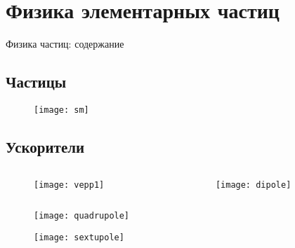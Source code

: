 \section{Физика элементарных частиц}
\begin{frame}{Физика частиц: содержание}
    \tableofcontents[currentsection, subsectionstyle=show/show/hide]
\end{frame}
\subsection{Частицы}
\begin{frame}
    \begin{figure}
        \begin{centering}
            \texttt{[image: sm]}
        \end{centering}
    \end{figure}
\end{frame}

\subsection{Ускорители}
\begin{frame}
    \begin{columns}
        \begin{column}{0.5\textwidth}
            \begin{figure}
                \begin{centering}
                    \texttt{[image: vepp1]}
                \end{centering}
            \end{figure}
        \end{column}
        \begin{column}{0.5\textwidth}
            \begin{figure}
                \begin{centering}
                    \texttt{[image: dipole]}
                \end{centering}
            \end{figure}
        \end{column}
    \end{columns}
\end{frame}


\begin{frame}
    \begin{figure}
        \begin{centering}
            \texttt{[image: quadrupole]}
        \end{centering}
    \end{figure}
\end{frame}
\begin{frame}
    \begin{figure}
        \begin{centering}
            \texttt{[image: sextupole]}
        \end{centering}
    \end{figure}
\end{frame}

